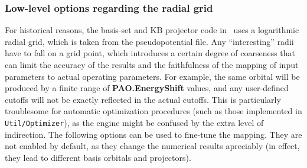 \subsubsection{Low-level options regarding the radial grid}

For historical reasons, the basis-set and KB projector code in
\siesta\ uses a logarithmic radial grid, which is taken from the
pseudopotential file. Any ``interesting'' radii have to fall on a grid
point, which introduces a certain degree of coarseness that can limit
the accuracy of the results and the faithfulness of the mapping of
input parameters to actual operating parameters. For example, the same
orbital will be produced by a finite range of \textbf{PAO.EnergyShift}
values, and any user-defined cutoffs will not be exactly reflected in
the actual cutoffs. This is particularly troublesome for automatic
optimization procedures (such as those implemented in
\texttt{Util/Optimizer}), as the engine might be confused by the extra
level of indirection. The following options can be used to fine-tune
the mapping.  They are not enabled by default, as they change the
numerical results apreciably (in effect, they lead to different basis
orbitals and projectors).

